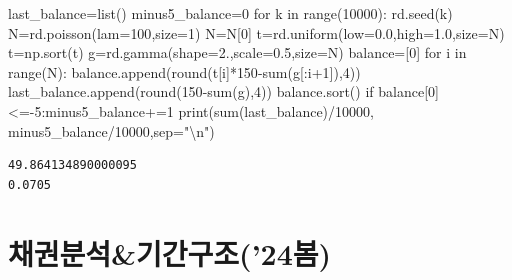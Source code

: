\documentclass[
  a4paper,
  DIV=11,
  numbers=noendperiod]{scrreprt}
\newenvironment{Shaded}{\begin{snugshade}}{\end{snugshade}}
\newcommand{\BuiltInTok}[1]{\textcolor[rgb]{0.00,0.23,0.31}{#1}}
\newcommand{\CharTok}[1]{\textcolor[rgb]{0.13,0.47,0.30}{#1}}
\newcommand{\ControlFlowTok}[1]{\textcolor[rgb]{0.00,0.23,0.31}{#1}}
\newcommand{\DecValTok}[1]{\textcolor[rgb]{0.68,0.00,0.00}{#1}}
\newcommand{\FloatTok}[1]{\textcolor[rgb]{0.68,0.00,0.00}{#1}}
\newcommand{\KeywordTok}[1]{\textcolor[rgb]{0.00,0.23,0.31}{#1}}
\newcommand{\NormalTok}[1]{\textcolor[rgb]{0.00,0.23,0.31}{#1}}
\newcommand{\OperatorTok}[1]{\textcolor[rgb]{0.37,0.37,0.37}{#1}}
\newcommand{\StringTok}[1]{\textcolor[rgb]{0.13,0.47,0.30}{#1}}
\begin{document}
\begin{Shaded}
\begin{Highlighting}[]
\NormalTok{last\_balance}\OperatorTok{=}\BuiltInTok{list}\NormalTok{()}
\NormalTok{minus5\_balance}\OperatorTok{=}\DecValTok{0}
\ControlFlowTok{for}\NormalTok{ k }\KeywordTok{in} \BuiltInTok{range}\NormalTok{(}\DecValTok{10000}\NormalTok{):}
\NormalTok{    rd.seed(k)}
\NormalTok{    N}\OperatorTok{=}\NormalTok{rd.poisson(lam}\OperatorTok{=}\DecValTok{100}\NormalTok{,size}\OperatorTok{=}\DecValTok{1}\NormalTok{)}
\NormalTok{    N}\OperatorTok{=}\NormalTok{N[}\DecValTok{0}\NormalTok{]}
\NormalTok{    t}\OperatorTok{=}\NormalTok{rd.uniform(low}\OperatorTok{=}\FloatTok{0.0}\NormalTok{,high}\OperatorTok{=}\FloatTok{1.0}\NormalTok{,size}\OperatorTok{=}\NormalTok{N)}
\NormalTok{    t}\OperatorTok{=}\NormalTok{np.sort(t)}
\NormalTok{    g}\OperatorTok{=}\NormalTok{rd.gamma(shape}\OperatorTok{=}\FloatTok{2.}\NormalTok{,scale}\OperatorTok{=}\FloatTok{0.5}\NormalTok{,size}\OperatorTok{=}\NormalTok{N)}
\NormalTok{    balance}\OperatorTok{=}\NormalTok{[}\DecValTok{0}\NormalTok{]}
    \ControlFlowTok{for}\NormalTok{ i }\KeywordTok{in} \BuiltInTok{range}\NormalTok{(N):}
\NormalTok{        balance.append(}\BuiltInTok{round}\NormalTok{(t[i]}\OperatorTok{*}\DecValTok{150}\OperatorTok{{-}}\BuiltInTok{sum}\NormalTok{(g[:i}\OperatorTok{+}\DecValTok{1}\NormalTok{]),}\DecValTok{4}\NormalTok{))}
\NormalTok{    last\_balance.append(}\BuiltInTok{round}\NormalTok{(}\DecValTok{150}\OperatorTok{{-}}\BuiltInTok{sum}\NormalTok{(g),}\DecValTok{4}\NormalTok{))}
\NormalTok{    balance.sort()}
    \ControlFlowTok{if}\NormalTok{ balance[}\DecValTok{0}\NormalTok{]}\OperatorTok{\textless{}={-}}\DecValTok{5}\NormalTok{:minus5\_balance}\OperatorTok{+=}\DecValTok{1}
\BuiltInTok{print}\NormalTok{(}\BuiltInTok{sum}\NormalTok{(last\_balance)}\OperatorTok{/}\DecValTok{10000}\NormalTok{,}
\NormalTok{      minus5\_balance}\OperatorTok{/}\DecValTok{10000}\NormalTok{,sep}\OperatorTok{=}\StringTok{"}\CharTok{\textbackslash{}n}\StringTok{"}\NormalTok{)}
\end{Highlighting}
\end{Shaded}

\begin{verbatim}
49.864134890000095
0.0705
\end{verbatim}

\part{채권분석\&기간구조('24봄)}
\end{document}
